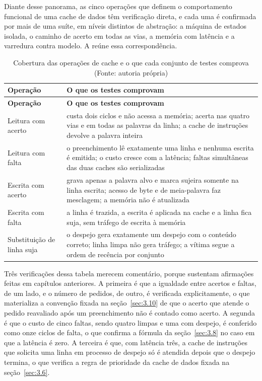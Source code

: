 Diante desse panorama, as cinco operações que definem o comportamento funcional de uma cache de dados têm verificação direta, e cada uma é confirmada por mais de uma suíte, em níveis distintos de abstração: a máquina de estados isolada, o caminho de acerto em todas as vias, a memória com latência e a varredura contra modelo. A  reúne essa correspondência.

{\small
\begin{longtable}{@{}>{\raggedright\arraybackslash}p{}>{\raggedright\arraybackslash}p{}@{}}
\caption[Cobertura das operações de cache e o que cada conjunto de testes comprova]{Cobertura das operações de cache e o que cada conjunto de testes comprova (Fonte: autoria própria)}\label{tab:4.2}\\
\hline
\textbf{Operação} & \textbf{O que os testes comprovam} \\
\hline
\endfirsthead
\hline
\textbf{Operação} & \textbf{O que os testes comprovam} \\
\hline
\endhead
\hline
\endlastfoot
Leitura com acerto & custa dois ciclos e não acessa a memória; acerta nas quatro vias e em todas as palavras da linha; a cache de instruções devolve a palavra inteira \\
Leitura com falta & o preenchimento lê exatamente uma linha e nenhuma escrita é emitida; o custo cresce com a latência; faltas simultâneas das duas caches são serializadas \\
Escrita com acerto & grava apenas a palavra alvo e marca sujeira somente na linha escrita; acesso de byte e de meia-palavra faz mesclagem; a memória não é atualizada \\
Escrita com falta & a linha é trazida, a escrita é aplicada na cache e a linha fica suja, sem tráfego de escrita à memória \\
Substituição de linha suja & o despejo gera exatamente um despejo com o conteúdo correto; linha limpa não gera tráfego; a vítima segue a ordem de recência por conjunto \\
\end{longtable}
}

Três verificações dessa tabela merecem comentário, porque sustentam afirmações feitas em capítulos anteriores. A primeira é que a igualdade entre acertos e faltas, de um lado, e o número de pedidos, de outro, é verificada explicitamente, o que materializa a convenção fixada na seção~\ref{sec:3.10} de que o acerto que atende o pedido reavaliado após um preenchimento não é contado como acerto. A segunda é que o custo de cinco faltas, sendo quatro limpas e uma com despejo, é conferido como onze ciclos de falta, o que confirma a fórmula da seção~\ref{sec:3.8} no caso em que a latência é zero. A terceira é que, com latência três, a cache de instruções que solicita uma linha em processo de despejo só é atendida depois que o despejo termina, o que verifica a regra de prioridade da cache de dados fixada na seção~\ref{sec:3.6}.

